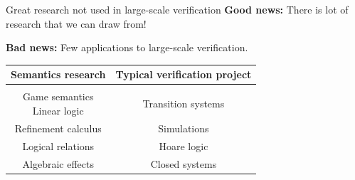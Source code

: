 \documentclass[aspectratio=141]{beamer}
\begin{document}
%

\begin{frame}{Great research not used in large-scale verification} %
  \textbf{Good news:}
  There is lot of research that we can draw from!

  \textbf{Bad news:}
  Few applications to
  large-scale verification.

  \vfill
  \begin{center}
    \begin{tabular}{cc}
      \hline
      Semantics research &
      Typical verification project
      \\
      \hline
      \\[-1ex]
      \parbox{10em}{\centering Game semantics \\ Linear logic} &
      Transition systems \\[1em]
      Refinement calculus &
      Simulations \\[1em]
      Logical relations &
      Hoare logic \\[1em]
      Algebraic effects &
      Closed systems \\[1em]
      \hline
    \end{tabular}
  \end{center}
\end{frame}
\end{document}
